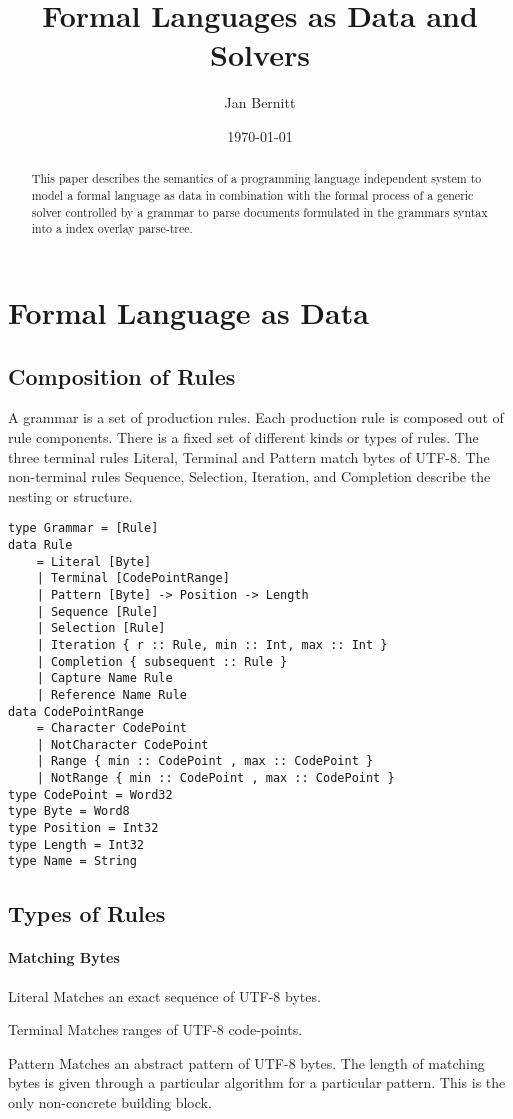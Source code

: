 \documentclass[10pt,a4paper]{article}
\begin{document}
\lstset{language=Haskell}
\title{Formal Languages as Data and Solvers}
\author{Jan Bernitt}
\date{\today}
\maketitle

\begin{abstract}
\noindent This paper describes the semantics of a programming language independent system to model a formal language as data in combination with the formal process of a generic solver controlled by a grammar to parse documents formulated in the grammars syntax into a index overlay parse-tree.
\end{abstract}
\section{Formal Language as Data}
\subsection{Composition of Rules}
A grammar is a set of production rules. Each production rule is composed out of rule components. There is a fixed set of different kinds or types of rules. The three terminal rules Literal, Terminal and Pattern match bytes of UTF-8. The non-terminal rules Sequence, Selection, Iteration, and Completion describe the nesting or structure.

\begin{lstlisting}
type Grammar = [Rule]
data Rule
	= Literal [Byte]
	| Terminal [CodePointRange]
	| Pattern [Byte] -> Position -> Length
	| Sequence [Rule]
	| Selection [Rule]
	| Iteration { r :: Rule, min :: Int, max :: Int }
	| Completion { subsequent :: Rule }
	| Capture Name Rule
	| Reference Name Rule
data CodePointRange
	= Character CodePoint
	| NotCharacter CodePoint
	| Range { min :: CodePoint , max :: CodePoint }
	| NotRange { min :: CodePoint , max :: CodePoint }
type CodePoint = Word32
type Byte = Word8
type Position = Int32
type Length = Int32
type Name = String
\end{lstlisting}

\subsection{Types of Rules}
\paragraph{Matching Bytes}
\begin{rulelist}
\item[Literal] Matches an exact sequence of UTF-8 bytes.

\item[Terminal] Matches ranges of UTF-8 code-points.

\item[Pattern] Matches an abstract pattern of UTF-8 bytes. The length of matching bytes is given through a particular algorithm for a particular pattern. This is the only non-concrete building block.
\end{rulelist}
\end{document}
